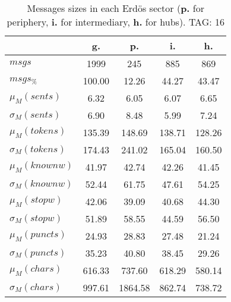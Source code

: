 \begin{table}[h!]
\begin{center}
\begin{tabular}{| l | c | c | c | c |}\hline
 & g. & p. & i. & h. \\\hline
$msgs$ & 1999  & 245  & 885  & 869 \\\hline
$msgs_{\%}$ & 100.00  & 12.26  & 44.27  & 43.47 \\\hline
$\mu_M(sents)$ & 6.32  & 6.05  & 6.07  & 6.65 \\\hline
$\sigma_M(sents)$ & 6.90  & 8.48  & 5.99  & 7.24 \\\hline
$\mu_M(tokens)$ & 135.39  & 148.69  & 138.71  & 128.26 \\\hline
$\sigma_M(tokens)$ & 174.43  & 241.02  & 165.04  & 160.50 \\\hline
$\mu_M(knownw)$ & 41.97  & 42.74  & 42.26  & 41.45 \\\hline
$\sigma_M(knownw)$ & 52.44  & 61.75  & 47.61  & 54.25 \\\hline
$\mu_M(stopw)$ & 42.06  & 39.09  & 40.68  & 44.30 \\\hline
$\sigma_M(stopw)$ & 51.89  & 58.55  & 44.59  & 56.50 \\\hline
$\mu_M(puncts)$ & 24.93  & 28.83  & 27.48  & 21.24 \\\hline
$\sigma_M(puncts)$ & 35.23  & 40.80  & 38.45  & 29.26 \\\hline
$\mu_M(chars)$ & 616.33  & 737.60  & 618.29  & 580.14 \\\hline
$\sigma_M(chars)$ & 997.61  & 1864.58  & 862.74  & 738.72 \\\hline
\end{tabular}
\caption{Messages sizes in each Erd\"os sector ({{\bf p.}} for periphery, {{\bf i.}} for intermediary, {{\bf h.}} for hubs). TAG: 16}
\end{center}
\end{table}